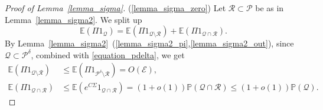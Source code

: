 \documentclass{article}
\theoremstyle{plain}
\theoremstyle{remark}
\theoremstyle{plain}
\numberwithin{equation}{section}
\begin{document}
	\begin{proof}[Proof of Lemma~\ref{lemma_sigma}]
		(\ref{lemma_sigma_zero}) Let $\mathcal{R}\subset\mathcal{P}$ be as in Lemma~\ref{lemma_sigma2}. We split up $$\mathbb{E}(\Pi1_{\mathcal{Q}})=\mathbb{E}(\Pi1_{\mathcal{Q}\setminus\mathcal{R}})+\mathbb{E}(\Pi1_{\mathcal{Q}\cap\mathcal{R}}).$$ By Lemma~\ref{lemma_sigma2}~(\ref{lemma_sigma2_pi},\ref{lemma_sigma2_out}), since $\mathcal{Q}\subset\mathcal{P}^{\delta}$, combined with \eqref{equation_pdelta}, we get
		\begin{align}
			\mathbb{E}(\Pi1_{\mathcal{Q}\setminus\mathcal{R}})&\leq\mathbb{E}(\Pi1_{\mathcal{P}^{\delta}\setminus\mathcal{R}})=O(\mathscr{E}),
			\\\mathbb{E}(\Pi1_{\mathcal{Q}\cap\mathcal{R}})&\leq\mathbb{E}(e^{C\Sigma}1_{\mathcal{Q}\cap\mathcal{R}})=(1+o(1))\mathbb{P}(\mathcal{Q}\cap\mathcal{R})\leq(1+o(1))\mathbb{P}(\mathcal{Q}).
		\end{align}
		

\end{proof}
\end{document}
